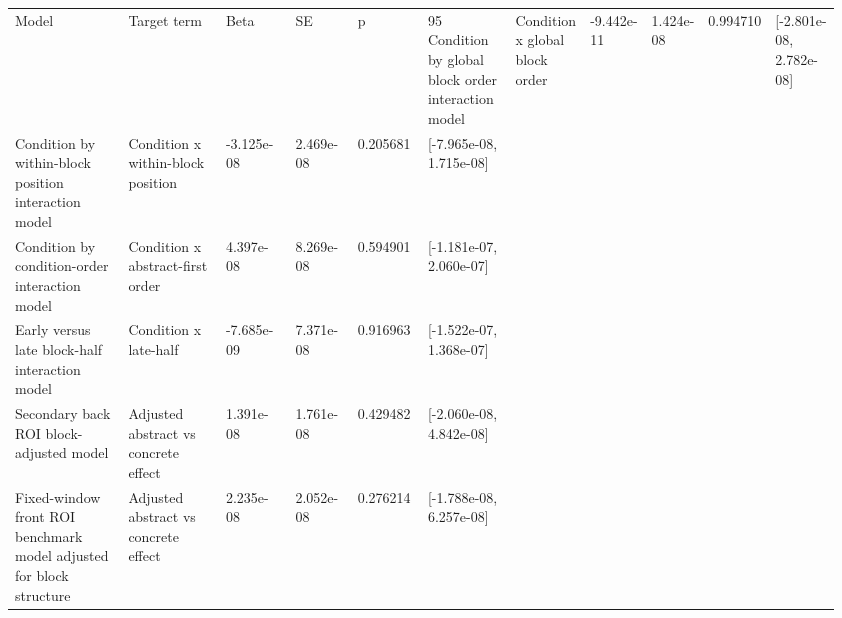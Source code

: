 \begin{tabular}{p{0.28\linewidth}p{0.22\linewidth}p{0.12\linewidth}p{0.10\linewidth}p{0.10\linewidth}p{0.14\linewidth}}
\toprule
Model & Target term & Beta & SE & p & 95%
\midrule
Condition by global block order interaction model & Condition x global block order & -9.442e-11 & 1.424e-08 & 0.994710 & [-2.801e-08, 2.782e-08]\\
Condition by within-block position interaction model & Condition x within-block position & -3.125e-08 & 2.469e-08 & 0.205681 & [-7.965e-08, 1.715e-08]\\
Condition by condition-order interaction model & Condition x abstract-first order & 4.397e-08 & 8.269e-08 & 0.594901 & [-1.181e-07, 2.060e-07]\\
Early versus late block-half interaction model & Condition x late-half & -7.685e-09 & 7.371e-08 & 0.916963 & [-1.522e-07, 1.368e-07]\\
Secondary back ROI block-adjusted model & Adjusted abstract vs concrete effect & 1.391e-08 & 1.761e-08 & 0.429482 & [-2.060e-08, 4.842e-08]\\
Fixed-window front ROI benchmark model adjusted for block structure & Adjusted abstract vs concrete effect & 2.235e-08 & 2.052e-08 & 0.276214 & [-1.788e-08, 6.257e-08]\\
\bottomrule
\end{tabular}
